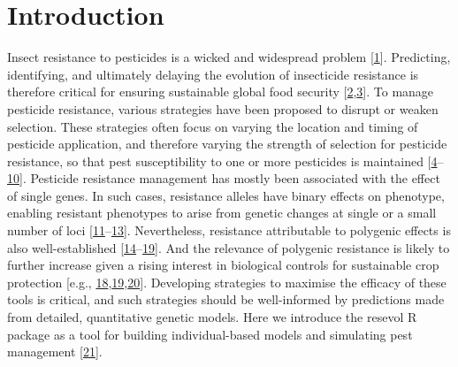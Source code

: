 \documentclass[10pt,letterpaper]{article}
\begin{document}
\section*{Introduction}
Insect resistance to pesticides is a wicked and widespread problem {[}\protect\hyperlink{ref-Gould2018}{1}{]}.
Predicting, identifying, and ultimately delaying the evolution of insecticide resistance is therefore critical for ensuring sustainable global food security {[}\protect\hyperlink{ref-Hawkins2019}{2},\protect\hyperlink{ref-Lykogianni2021}{3}{]}.
To manage pesticide resistance, various strategies have been proposed to disrupt or weaken selection.
These strategies often focus on varying the location and timing of pesticide application, and therefore varying the strength of selection for pesticide resistance, so that pest susceptibility to one or more pesticides is maintained {[}\protect\hyperlink{ref-Ives2002}{4}--\protect\hyperlink{ref-Saikai2021}{10}{]}.
Pesticide resistance management has mostly been associated with the effect of single genes.
In such cases, resistance alleles have binary effects on phenotype, enabling resistant phenotypes to arise from genetic changes at single or a small number of loci {[}\protect\hyperlink{ref-Raymond2001}{11}--\protect\hyperlink{ref-Ffrench-Constant2013}{13}{]}.
Nevertheless, resistance attributable to polygenic effects is also well-established {[}\protect\hyperlink{ref-Via1986}{14}--\protect\hyperlink{ref-Mangan2023}{19}{]}.
And the relevance of polygenic resistance is likely to further increase given a rising interest in biological controls for sustainable crop protection {[}e.g., \protect\hyperlink{ref-Green2020}{18},\protect\hyperlink{ref-Mangan2023}{19},\protect\hyperlink{ref-Elnahal2022}{20}{]}.
Developing strategies to maximise the efficacy of these tools is critical, and such strategies should be well-informed by predictions made from detailed, quantitative genetic models.
Here we introduce the resevol R package as a tool for building individual-based models and simulating pest management {[}\protect\hyperlink{ref-Daly2022}{21}{]}.
\end{document}
